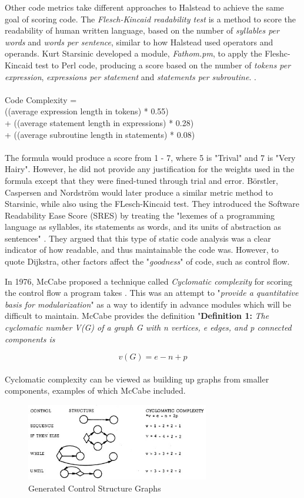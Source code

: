 \documentclass[manuscript,screen,review,sigconf]{acmart}
\begin{document}
Other code metrics take different approaches to Halstead to achieve the same goal of scoring code. The \textit{Flesch-Kincaid readability test} \cite{FleschReading} is a method to score the readability of human written language, based on the number of \textit{syllables per words} and \textit{words per sentence}, similar to how Halstead used operators and operands. Kurt Starsinic developed a module, \textit{Fathom.pm}, to apply the Fleshc-Kincaid test to Perl code, producing a score based on the number of \textit{{}tokens per expression}, \textit{expressions per statement} and \textit{statements per subroutine}. \cite{Starsinic_1998}.
\\ \\
Code Complexity =\\
  ((average expression length in tokens) * 0.55)\\
+ ((average statement length in expressions) * 0.28)\\
+ ((average subroutine length in statements) * 0.08)\\
\\
The formula would produce a score from 1 - 7, where 5 is "Trival" and 7 is "Very Hairy".  However, he did not provide any justification for the weights used in the formula except that they were fined-tuned through trial and error.
Börstler, Caspersen and Nordström would later produce a similar metric method to Starsinic, while also using the FLesch-Kincaid test. They introduced the Software Readability Ease Score (SRES) by treating the "lexemes of a programming language as syllables, its statements as words, and its units of abstraction as sentences" \cite{borstler2007beauty}. They argued that this type of static code analysis was a clear indicator of how readable, and thus maintainable the code was. However, to quote Dijkstra, other factors affect the "\textit{goodness}" of code, such as control flow.

In 1976, McCabe proposed a technique called \textit{Cyclomatic complexity} for scoring the control flow a program takes \cite{A_Complexity_Measure}. This was an attempt to "\textit{provide a quantitative basis for modularization}" as a way to identify in advance modules which will be difficult to maintain. McCabe provides the definition
"\textbf{Definition 1:} \textit{The cyclomatic number V(G) of a graph G
with n vertices, e edges, and p connected components is}

\[v(G)=e- n+p\]
\\
Cyclomatic complexity can be viewed as building up graphs from smaller components, examples of which McCabe included.
\begin{figure}[h]
    \includegraphics[width=8cm]{controlFlowDia.jpg}
    \caption{Generated Control Structure Graphs}
    \label{fig:CC Graphs}
    \centering
\end{figure}
\end{document}

